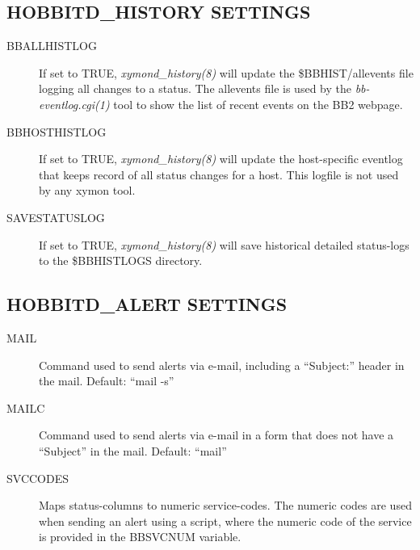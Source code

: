 \subsection{HOBBITD\_HISTORY SETTINGS}


 \begin{description}
\item[BBALLHISTLOG] If set to TRUE, \emph{xymond\_history(8)}
 will update the \$BBHIST/allevents file logging all changes to a status. The allevents file is used by the \emph{bb-eventlog.cgi(1)}
 tool to show the list of recent events on the BB2 webpage. 

 

\item[BBHOSTHISTLOG] If set to TRUE, \emph{xymond\_history(8)}
 will update the host-specific eventlog that keeps record of all status changes for a host. This logfile is not used by any xymon tool. 

 

\item[SAVESTATUSLOG] If set to TRUE, \emph{xymond\_history(8)}
 will save historical detailed status-logs to the \$BBHISTLOGS directory. 

 


 


\end{description}

\subsection{HOBBITD\_ALERT SETTINGS}


 \begin{description}
\item[MAIL] Command used to send alerts via e-mail, including a ``Subject:'' header in the mail. Default: ``mail -s'' 

 

\item[MAILC] Command used to send alerts via e-mail in a form that does not have a ``Subject'' in the mail. Default: ``mail'' 

 

\item[SVCCODES] Maps status-columns to numeric service-codes. The numeric codes are used when sending an alert using a script, where the numeric code of the service is provided in the BBSVCNUM variable. 

 


 


\end{description}

